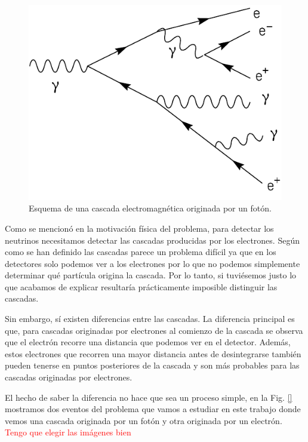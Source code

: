 \documentclass[a4paper,12pt,twoside,titlepage]{article}
\newcommand{\red}[1]{\textcolor{red}{#1}}
\begin{document}
\begin{figure}[h!]
  \centering
  \includegraphics[scale=0.85]{Schematic_of_a_particle_shower.pdf}
  \caption{Esquema de una cascada electromagnética originada por un fotón.}
  \label{fig:cascada}
\end{figure}

Como se mencionó en la motivación física del problema, para detectar los neutrinos necesitamos detectar las cascadas producidas por los electrones. Según como se han definido las cascadas parece un problema difícil ya que en los detectores solo podemos ver a los electrones por lo que no podemos simplemente determinar qué partícula origina la cascada. Por lo tanto, si tuviésemos justo lo que acabamos de explicar resultaría prácticamente imposible distinguir las cascadas.

Sin embargo, sí existen diferencias entre las cascadas. La diferencia principal es que, para cascadas originadas por electrones al comienzo de la cascada se observa que el electrón recorre una distancia que podemos ver en el detector. Además, estos electrones que recorren una mayor distancia antes de desintegrarse también pueden tenerse en puntos posteriores de la cascada y son más probables para las cascadas originadas por electrones.

El hecho de saber la diferencia no hace que sea un proceso simple, en la Fig. \ref{} mostramos dos eventos del problema que vamos a estudiar en este trabajo donde vemos una cascada originada por un fotón y otra originada por un electrón. \red{Tengo que elegir las imágenes bien}
\end{document}
